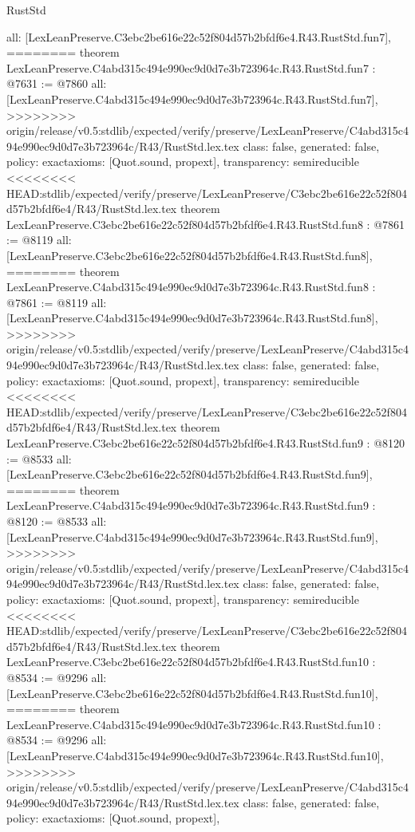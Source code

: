 \begin{lexlean}{RustStd}
\begin{coremodule}
{\begin{coremodule}
{{{{{{{{{{  all: [LexLeanPreserve.C3ebc2be616e22c52f804d57b2bfdf6e4.R43.RustStd.fun7],
========
theorem LexLeanPreserve.C4abd315c494e990ec9d0d7e3b723964c.R43.RustStd.fun7 : @7631 := @7860 {
  all: [LexLeanPreserve.C4abd315c494e990ec9d0d7e3b723964c.R43.RustStd.fun7],
>>>>>>>> origin/release/v0.5:stdlib/expected/verify/preserve/LexLeanPreserve/C4abd315c494e990ec9d0d7e3b723964c/R43/RustStd.lex.tex
  class: false,
  generated: false,
  policy: exact{axioms: [Quot.sound, propext]},
  transparency: semireducible
}
<<<<<<<< HEAD:stdlib/expected/verify/preserve/LexLeanPreserve/C3ebc2be616e22c52f804d57b2bfdf6e4/R43/RustStd.lex.tex
theorem LexLeanPreserve.C3ebc2be616e22c52f804d57b2bfdf6e4.R43.RustStd.fun8 : @7861 := @8119 {
  all: [LexLeanPreserve.C3ebc2be616e22c52f804d57b2bfdf6e4.R43.RustStd.fun8],
========
theorem LexLeanPreserve.C4abd315c494e990ec9d0d7e3b723964c.R43.RustStd.fun8 : @7861 := @8119 {
  all: [LexLeanPreserve.C4abd315c494e990ec9d0d7e3b723964c.R43.RustStd.fun8],
>>>>>>>> origin/release/v0.5:stdlib/expected/verify/preserve/LexLeanPreserve/C4abd315c494e990ec9d0d7e3b723964c/R43/RustStd.lex.tex
  class: false,
  generated: false,
  policy: exact{axioms: [Quot.sound, propext]},
  transparency: semireducible
}
<<<<<<<< HEAD:stdlib/expected/verify/preserve/LexLeanPreserve/C3ebc2be616e22c52f804d57b2bfdf6e4/R43/RustStd.lex.tex
theorem LexLeanPreserve.C3ebc2be616e22c52f804d57b2bfdf6e4.R43.RustStd.fun9 : @8120 := @8533 {
  all: [LexLeanPreserve.C3ebc2be616e22c52f804d57b2bfdf6e4.R43.RustStd.fun9],
========
theorem LexLeanPreserve.C4abd315c494e990ec9d0d7e3b723964c.R43.RustStd.fun9 : @8120 := @8533 {
  all: [LexLeanPreserve.C4abd315c494e990ec9d0d7e3b723964c.R43.RustStd.fun9],
>>>>>>>> origin/release/v0.5:stdlib/expected/verify/preserve/LexLeanPreserve/C4abd315c494e990ec9d0d7e3b723964c/R43/RustStd.lex.tex
  class: false,
  generated: false,
  policy: exact{axioms: [Quot.sound, propext]},
  transparency: semireducible
}
<<<<<<<< HEAD:stdlib/expected/verify/preserve/LexLeanPreserve/C3ebc2be616e22c52f804d57b2bfdf6e4/R43/RustStd.lex.tex
theorem LexLeanPreserve.C3ebc2be616e22c52f804d57b2bfdf6e4.R43.RustStd.fun10 : @8534 := @9296 {
  all: [LexLeanPreserve.C3ebc2be616e22c52f804d57b2bfdf6e4.R43.RustStd.fun10],
========
theorem LexLeanPreserve.C4abd315c494e990ec9d0d7e3b723964c.R43.RustStd.fun10 : @8534 := @9296 {
  all: [LexLeanPreserve.C4abd315c494e990ec9d0d7e3b723964c.R43.RustStd.fun10],
>>>>>>>> origin/release/v0.5:stdlib/expected/verify/preserve/LexLeanPreserve/C4abd315c494e990ec9d0d7e3b723964c/R43/RustStd.lex.tex
  class: false,
  generated: false,
  policy: exact{axioms: [Quot.sound, propext]},
}}}}}}}}}}}}}}
\end{coremodule}}
\end{coremodule}
\end{lexlean}
